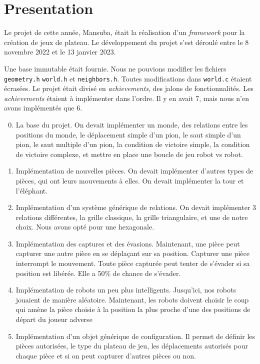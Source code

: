 \section{Presentation}

Le projet de cette année, Mansuba, était la réalisation d'un \emph{framework} pour la création de jeux de plateau.
Le développement du projet s'est déroulé entre le 8 novembre 2022 et le 13 janvier 2023.

Une base immutable était fournie. Nous ne pouvions modifier les fichiers \verb|geometry.h| \verb|world.h| et \verb|neighbors.h|.
Toutes modifications dans \verb|world.c| étaient écrasées.
Le projet était divisé en \emph{achievements}, des jalons de fonctionnalités.
Les \emph{achievements} étaient à implémenter dans l'ordre.
Il y en avait 7, mais nous n'en avons implémentés que 6.

\begin{enumerate}
    \setcounter{enumi}{-1}
    \item La base du projet. On devait implémenter un monde, 
    des relations entre les positions du monde, le déplacement simple d'un pion, 
    le saut simple d'un pion, le saut multiple d'un pion, 
    la condition de victoire simple, la condition de victoire complexe,
    et mettre en place une boucle de jeu robot vs robot.
    \item Implémentation de nouvelles pièces. On devait implémenter d'autres
    types de pièces, qui ont leurs mouvements à elles. On devait implémenter la tour et l'éléphant.
    \item Implémentation d'un système générique de relations. On devait implémenter
    3 relations différentes, la grille classique, la grille triangulaire, et une de notre choix. Nous avons opté pour une hexagonale.
    \item Implémentation des captures et des évasions. Maintenant, une pièce peut capturer une autre pièce
    en se déplaçant sur sa position. Capturer une pièce interrompt le mouvement. Toute pièce capturée
    peut tenter de s'évader si sa position est libérée. Elle a 50\% de chance de s'évader.
    \item Implémentation de robots un peu plus intelligents. Jusqu'ici, nos robots jouaient de manière aléatoire.
    Maintenant, les robots doivent choisir le coup qui amène la pièce choisie à la position la plus proche
    d'une des positions de départ du joueur adverse
    \item Implémentation d'un objet générique de configuration. Il permet de définir 
    les pièces autorisées, le type du plateau de jeu, les déplacements autorisés pour chaque pièce
    et si on peut capturer d'autres pièces ou non. 
\end{enumerate}

